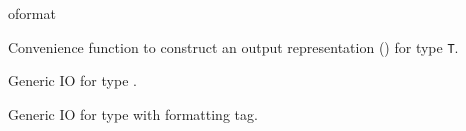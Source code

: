 \begin{ccRefFunction}{oformat}

\ccDefinition

Convenience function to construct an output representation () for type \texttt{T}.

           {Generic IO for type .}

           {Generic IO for type  with formatting tag.}


\end{ccRefFunction}